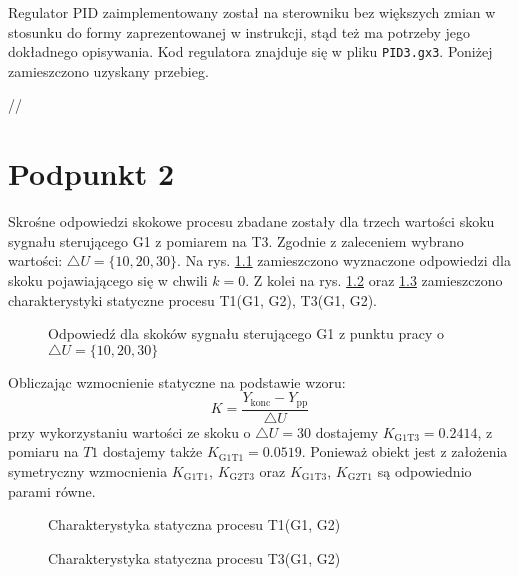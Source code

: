 Regulator PID zaimplementowany został na sterowniku bez większych zmian w stosunku do formy zaprezentowanej w instrukcji, stąd też ma potrzeby jego dokładnego opisywania. Kod regulatora znajduje się w pliku \verb+PID3.gx3+. Poniżej zamieszczono uzyskany przebieg.



//


\chapter{Podpunkt 2}
Skrośne odpowiedzi skokowe procesu zbadane zostały dla trzech wartości skoku sygnału sterującego G1 z pomiarem na T3. Zgodnie z zaleceniem wybrano wartości: $\triangle U = \{10, 20, 30\}$. Na rys. \ref{Z2steps} zamieszczono wyznaczone odpowiedzi dla skoku pojawiającego się w chwili $k=\num{0}$. Z kolei na rys. \ref{Z2T1} oraz \ref{Z2T3} zamieszczono charakterystyki statyczne procesu T1(G1, G2), T3(G1, G2).

\begin{figure}[ht]
\centering

\caption{Odpowiedź dla skoków sygnału sterującego G1 z punktu pracy o $\triangle U = \{10, 20, 30\}$}
\label{Z2steps}
\end{figure}

Obliczając wzmocnienie statyczne na podstawie wzoru:
\begin{equation}
K=\frac{Y_{\mathrm{konc}}-Y_{\mathrm{pp}}}{\triangle U}
\end{equation}
przy wykorzystaniu wartości ze skoku o $ \triangle U = 30 $ dostajemy $K_{\mathrm{G1 T3}} = \num{0.2414}$, z pomiaru na $T1$ dostajemy także $K_{\mathrm{G1 T1}} = \num{0.0519}$. Ponieważ obiekt jest z założenia symetryczny wzmocnienia $K_{\mathrm{G1 T1}}$, $K_{\mathrm{G2 T3}}$ oraz $K_{\mathrm{G1 T3}}$, $K_{\mathrm{G2 T1}}$ są odpowiednio parami równe.

\begin{figure}[ht]
\centering

\caption{Charakterystyka statyczna procesu T1(G1, G2)}
\label{Z2T1}
\end{figure}

\begin{figure}[ht]
\centering

\caption{Charakterystyka statyczna procesu T3(G1, G2)}
\label{Z2T3}
\end{figure}


